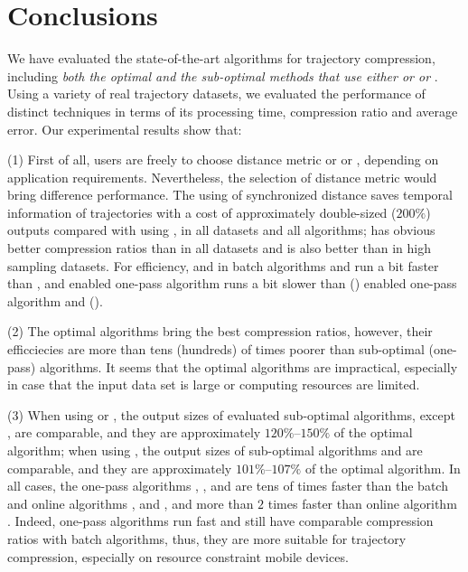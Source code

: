 \vspace{-1ex}
\section{Conclusions}

We have evaluated the state-of-the-art \lsa algorithms for trajectory compression, including \emph{both the optimal and the sub-optimal methods that use either \ped or \sed or \dad}. 
Using a variety of real trajectory datasets, we evaluated the performance of distinct techniques in terms of its processing time, compression ratio and average error.
Our experimental results show that: 

(1) First of all, users are freely to choose distance metric \sed or \ped or \dad, depending on application requirements. Nevertheless, the selection of distance metric would bring difference performance. The using of synchronized distance \sed saves temporal information of trajectories with a cost of approximately double-sized (\ie $200\%$) outputs compared with using \ped, in all datasets and all algorithms; \ped has obvious better compression ratios than \dad in all datasets and \sed is also better than \dad in high sampling datasets. For efficiency, \sed and \dad in batch algorithms \dpa and \tpa run a bit faster than \ped, and \sed enabled one-pass algorithm \cised runs a bit slower than \ped (\dad) enabled one-pass algorithm \siped and \operb (\interval).

(2) The optimal algorithms bring the best compression ratios, however, their efficciecies are more than tens (hundreds) of times poorer than sub-optimal (one-pass) algorithms. It seems that the optimal algorithms are impractical, especially in case that the input data set is large or computing resources are limited.

(3) When using \ped or \sed, the output sizes of evaluated sub-optimal algorithms, except \squishe, are comparable, and they are approximately $120\%$--$150\%$ of the optimal algorithm; when using \dad, the output sizes of sub-optimal algorithms \tpa and \interval are comparable, and they are approximately $101\%$--$107\%$ of the optimal algorithm. In all cases, the one-pass algorithms \siped, \operb, \cised and \interval are tens of times faster than the batch and online algorithms \tpa, \dpa and \bqsa, and more than $2$ times faster than online algorithm \squishe. Indeed, one-pass algorithms run fast and still have comparable compression ratios with batch algorithms, thus, they are more suitable for trajectory compression, especially on resource constraint mobile devices.

